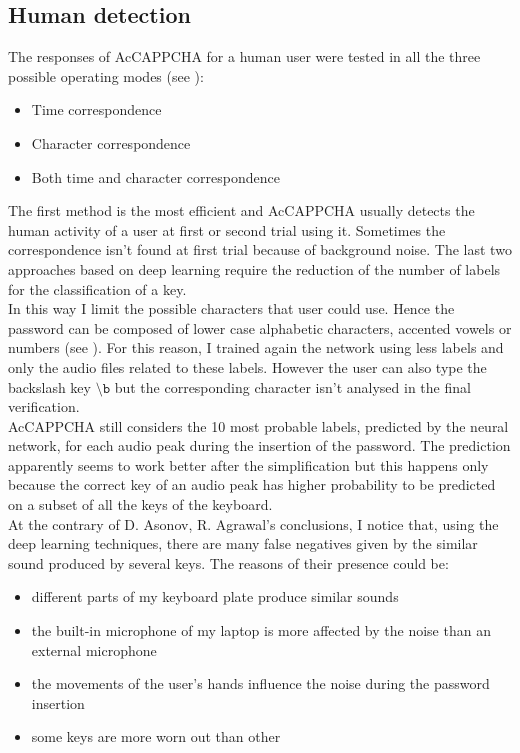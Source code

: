 \subsection{Human detection}\label{Results:human}
The responses of AcCAPPCHA for a human user were tested in all the three possible operating modes (see ): 
\begin{itemize}
\item{Time correspondence}
\item{Character correspondence}
\item{Both time and character correspondence}
\end{itemize}
The first method is the most efficient and AcCAPPCHA usually detects the human activity of a user at first or second trial using it. Sometimes the correspondence isn't found at first trial because of background noise. The last two approaches based on deep learning require the reduction of the number of labels for the classification of a key.\\
In this way I limit the possible characters that user could use. Hence the password can be composed of lower case alphabetic characters, accented vowels or numbers (see ). For this reason, I trained again the network using less labels and only the audio files related to these labels. However the user can also type the backslash key $\mathtt{\setminus b}$ but the corresponding character isn't analysed in the final verification.\\
AcCAPPCHA still considers the 10 most probable labels, predicted by the neural network, for each audio peak during the insertion of the password. The prediction apparently seems to work better after the simplification but this happens only because the correct key of an audio peak has higher probability to be predicted on a subset of all the keys of the keyboard.\\
At the contrary of D. Asonov, R. Agrawal's conclusions\cite{keyboard_acoustic}, I notice that, using the deep learning techniques, there are many false negatives given by the similar sound produced by several keys. The reasons of their presence could be:
\begin{itemize}
\item{different parts of my keyboard plate produce similar sounds}
\item{the built-in microphone of my laptop is more affected by the noise than an external microphone}
\item{the movements of the user's hands influence the noise during the password insertion}
\item{some keys are more worn out than other} 
\end{itemize}
